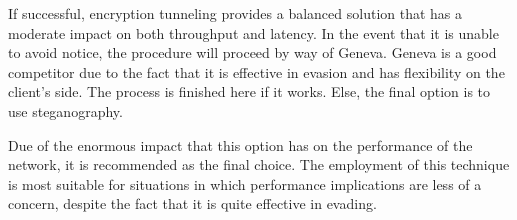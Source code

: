 \documentclass[12pt, fleqn, a4paper]{article}
\begin{document}
If successful, encryption tunneling provides a balanced solution that has a moderate impact on both throughput and latency. In the event that it is unable to avoid notice, the procedure will proceed by way of Geneva.
Geneva is a good competitor due to the fact that it is effective in evasion and has flexibility on the client's side. The process is finished here if it works. Else, the final option is to use steganography.

Due of the enormous impact that this option has on the performance of the network, it is recommended as the final choice. The employment of this technique is most suitable for situations in which performance implications are less of a concern, despite the fact that it is quite effective in evading.

%
\end{document}
